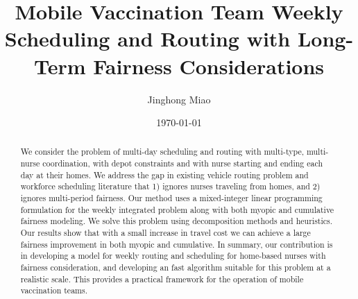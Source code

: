 \documentclass[11pt]{article}
\title{Mobile Vaccination Team Weekly Scheduling and Routing with Long-Term Fairness Considerations}
\author{Jinghong Miao}
\date{\today}
\begin{document}
\maketitle

\begin{abstract}
We consider the problem of multi-day scheduling and routing with multi-type, multi-nurse coordination, with depot constraints and with nurse starting and ending each day at their homes. We address the gap in existing vehicle routing problem and workforce scheduling literature that 1) ignores nurses traveling from homes, and 2) ignores multi-period fairness. Our method uses a mixed-integer linear programming formulation for the weekly integrated problem along with both myopic and cumulative fairness modeling. We solve this problem using decomposition methods and heuristics. Our results show that with a small increase in travel cost we can achieve a large fairness improvement in both myopic and cumulative. In summary, our contribution is in developing a model for weekly routing and scheduling for home-based nurses with fairness consideration, and developing an fast algorithm suitable for this problem at a realistic scale. This provides a practical framework for the operation of mobile vaccination teams. 
\end{abstract}

\tableofcontents
\newpage

% 
% 
% 
% 
% 
% 














\appendix
% 
\end{document}
